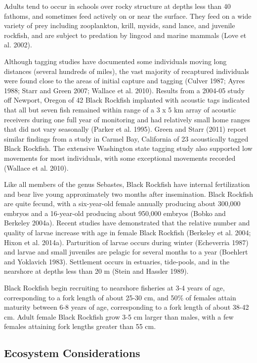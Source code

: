 \documentclass[11pt,
  english,
  letterpaper,
]{article}
\begin{document}
Adults tend to occur in schools over rocky structure at depths less than 40 fathoms, and sometimes feed actively on or near the surface. They feed on a wide variety of prey including zooplankton, krill, mysids, sand lance, and juvenile rockfish, and are subject to predation by lingcod and marine mammals (Love et al. 2002).

Although tagging studies have documented some individuals moving long distances (several hundreds of miles), the vast majority of recaptured individuals were found close to the areas of initial capture and tagging (Culver 1987; Ayres 1988; Starr and Green 2007; Wallace et al. 2010). Results from a 2004-05 study off Newport, Oregon of 42 Black Rockfish implanted with acoustic tags indicated that all but seven fish remained within range of a 3 x 5 km array of acoustic receivers during one full year of monitoring and had relatively small home ranges that did not vary seasonally (Parker et al. 1995). Green and Starr (2011) report similar findings from a study in Carmel Bay, California of 23 acoustically tagged Black Rockfish. The extensive Washington state tagging study also supported low movements for most individuals, with some exceptional movements recorded (Wallace et al. 2010).

Like all members of the genus Sebastes, Black Rockfish have internal fertilization and bear live young approximately two months after insemination. Black Rockfish are quite fecund, with a six-year-old female annually producing about 300,000 embryos and a 16-year-old producing about 950,000 embryos (Bobko and Berkeley 2004a). Recent studies have demonstrated that the relative number and quality of larvae increase with age in female Black Rockfish (Berkeley et al. 2004; Hixon et al. 2014a). Parturition of larvae occurs during winter (Echeverria 1987) and larvae and small juveniles are pelagic for several months to a year (Boehlert and Yoklavich 1983). Settlement occurs in estuaries, tide-pools, and in the nearshore at depths less than 20 m (Stein and Hassler 1989).

Black Rockfish begin recruiting to nearshore fisheries at 3-4 years of age, corresponding to a fork length of about 25-30 cm, and 50\% of females attain maturity between 6-8 years of age, corresponding to a fork length of about 38-42 cm. Adult female Black Rockfish grow 3-5 cm larger than males, with a few females attaining fork lengths greater than 55 cm.

\hypertarget{ecosystem-considerations-1}{%
\subsection{Ecosystem Considerations}\label{ecosystem-considerations-1}}
\end{document}
